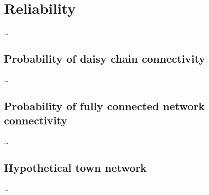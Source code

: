 
\section{Reliability}
\dots

\subsection{Probability of daisy chain connectivity}
\dots

\subsection{Probability of fully connected network connectivity}
\dots

\subsection{Hypothetical town network}
\dots

